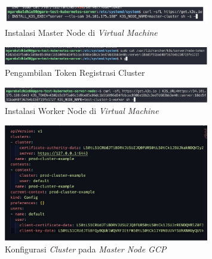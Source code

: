 \begin{figure}[ht]
  \centering
  \includegraphics[width=0.8\textwidth]{resources/chapter-4/pengujian/kube-gcp-04.jpg}
  \caption{Instalasi Master Node di \textit{Virtual Machine}}
  \label{fig:instalasi-master-node-gcp}
\end{figure}

\begin{figure}[ht]
  \centering
  \includegraphics[width=0.8\textwidth]{resources/chapter-4/pengujian/kube-gcp-05.jpg}
  \caption{Pengambilan Token Registrasi Cluster}
  \label{fig:pengambilan-token-registrasi-cluster}
\end{figure}

\begin{figure}[ht]
  \centering
  \includegraphics[width=0.8\textwidth]{resources/chapter-4/pengujian/kube-gcp-06.jpg}
  \caption{Instalasi Worker Node di \textit{Virtual Machine}}
  \label{fig:instalasi-worker-node-gcp}
\end{figure}

\begin{figure}[ht]
  \centering
  \includegraphics[width=0.8\textwidth]{resources/chapter-4/pengujian/kube-gcp-07.jpg}
  \caption{Konfigurasi \textit{Cluster} pada \textit{Master Node GCP}}
  \label{fig:konfigurasi-cluster-master-node-gcp}
\end{figure}

